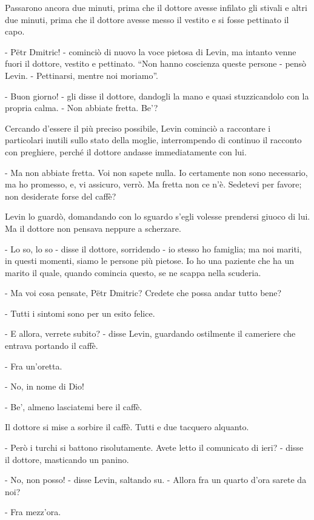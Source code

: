Passarono ancora due minuti, prima che il dottore avesse infilato gli stivali e altri due minuti, prima che il dottore avesse messo il vestito e si fosse pettinato il capo. 

- Pëtr Dmitric! - cominciò di nuovo la voce pietosa di Levin, ma intanto venne fuori il dottore, vestito e pettinato. ``Non hanno coscienza queste persone - pensò Levin. - Pettinarsi, mentre noi moriamo''. 

- Buon giorno! - gli disse il dottore, dandogli la mano e quasi stuzzicandolo con la propria calma. - Non abbiate fretta. Be'? 

Cercando d'essere il più preciso possibile, Levin cominciò a raccontare i particolari inutili sullo stato della moglie, interrompendo di continuo il racconto con preghiere, perché il dottore andasse immediatamente con lui. 

- Ma non abbiate fretta. Voi non sapete nulla. Io certamente non sono necessario, ma ho promesso, e, vi assicuro, verrò. Ma fretta non ce n'è. Sedetevi per favore; non desiderate forse del caffè? 

Levin lo guardò, domandando con lo sguardo s'egli volesse prendersi giuoco di lui. Ma il dottore non pensava neppure a scherzare. 

- Lo so, lo so - disse il dottore, sorridendo - io stesso ho famiglia; ma noi mariti, in questi momenti, siamo le persone più pietose. Io ho una paziente che ha un marito il quale, quando comincia questo, se ne scappa nella scuderia. 

- Ma voi cosa pensate, Pëtr Dmitric? Credete che possa andar tutto bene? 

- Tutti i sintomi sono per un esito felice. 

- E allora, verrete subito? - disse Levin, guardando ostilmente il cameriere che entrava portando il caffè. 

- Fra un'oretta. 

- No, in nome di Dio! 

- Be', almeno lasciatemi bere il caffè. 

Il dottore si mise a sorbire il caffè. Tutti e due tacquero alquanto. 

- Però i turchi si battono risolutamente. Avete letto il comunicato di ieri? - disse il dottore, masticando un panino. 

- No, non posso! - disse Levin, saltando su. - Allora fra un quarto d'ora sarete da noi? 

- Fra mezz'ora. 

